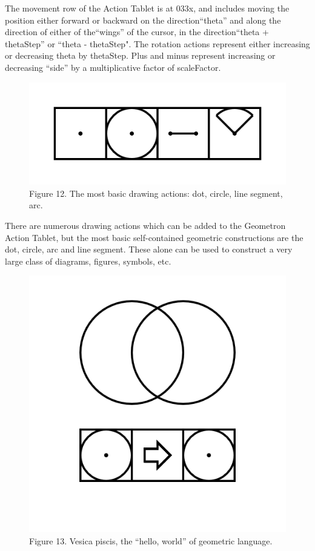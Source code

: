 \documentclass[11pt]{article}
\begin{document}
    The movement row of the Action Tablet is at 033x, and includes moving the position either forward or backward on the direction``theta'' and along the direction of either of the``wings'' of the cursor, in the direction``theta + thetaStep'' or ``theta - thetaStep".  The rotation actions represent either increasing or decreasing theta by thetaStep.  Plus and minus represent increasing or decreasing ``side'' by a multiplicative factor of scaleFactor.  


\begin{figure}

\includegraphics[width=\linewidth]{figures/figure12_basicDraw.png}

\caption{Figure 12. The most basic drawing actions: dot, circle, line segment, arc.}
\end{figure}


    There are numerous drawing actions which can be added to the Geometron Action Tablet, but the most basic self-contained geometric constructions are the dot, circle, arc and line segment.  These alone can be used to construct a very large class of diagrams, figures, symbols, etc.  



\begin{figure}

\includegraphics[width=\linewidth]{figures/figure13_vesicaPisces.png}

\caption{Figure 13. Vesica piscis, the ``hello, world'' of geometric language.}
\end{figure}
\end{document}
